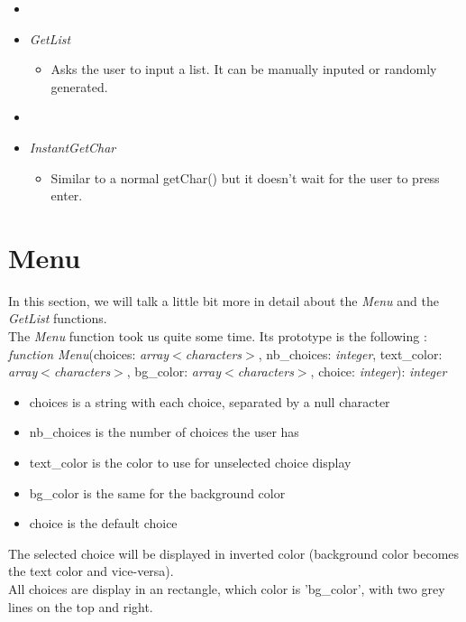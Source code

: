 \documentclass[book, backcover, english, nodocumentinfo]{upmethodology-document}
\begin{document}
\begin{itemize}
				\item[]{}
			\item{}\textit{GetList}
				\begin{itemize}
					\item[]{} Asks the user to input a list. It can be manually inputed or randomly generated.
				\end{itemize}
				\item[]{}
			\item{} \textit{InstantGetChar}
				\begin{itemize}
					\item[]{} Similar to a normal getChar() but it doesn't wait for the user to press enter.
				\end{itemize}
		\end{itemize}
	\section{Menu}
		In this section, we will talk a little bit more in detail about the \textit{Menu} and the \textit{GetList} functions.\\
		\newline
		The \textit{Menu} function took us quite some time. Its prototype is the following :\\
		\textit{function Menu}(choices: \textit{array$<$characters$>$}, nb\_choices: \textit{integer}, text\_color: \textit{array$<$characters$>$}, bg\_color: \textit{array$<$characters$>$}, choice: \textit{integer}): \textit{integer}\\
		\begin{itemize}
			\item{} choices is a string with each choice, separated by a null character
			\item{} nb\_choices is the number of choices the user has
			\item{} text\_color is the color to use for unselected choice display
			\item{} bg\_color is the same for the background color
			\item{} choice is the default choice
		\end{itemize}
		The selected choice will be displayed in inverted color (background color becomes the text color and vice-versa).\\
		All choices are display in an rectangle, which color is 'bg\_color', with two grey lines on the top and right.\\
		\newline
		\ov\\
\end{document}
